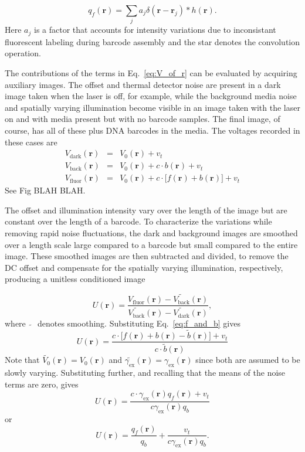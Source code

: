 \begin{equation} \label{eq:withPSF}
q_f(\mathbf{r})=\sum_j a_j \delta(\mathbf{r}-\mathbf{r}_j) * h(\mathbf{r}).
\end{equation}
Here $a_j$ is a factor that accounts for intensity variations due to inconsistant fluorescent labeling  during barcode assembly and the star denotes the convolution operation.

The contributions of the terms in Eq.~\ref{eq:V_of_r} can be evaluated by acquiring auxiliary images. The offset and thermal detector noise are present in a dark image taken when the laser is off, for example, while the background media noise and spatially varying illumination become visible in an image taken with the laser on and with media present but with no barcode samples. The final image, of course, has all of these plus DNA barcodes in the media. The voltages recorded in these cases are
\begin{eqnarray}
V_{\text{dark}}(\mathbf{r})&=&V_0(\mathbf{r})+v_t\\
V_{\text{back}}(\mathbf{r})&=&V_0(\mathbf{r})+c \cdot  b(\mathbf{r})  +v_t\\
V_{\text{fluor}}(\mathbf{r})&=&V_0(\mathbf{r})+c \cdot \big[ f(\mathbf{r}) + b(\mathbf{r})\big]  +v_t
\end{eqnarray}
See Fig BLAH BLAH. 

The offset and illumination intensity vary over the length of the image but are constant over the length of a barcode. To characterize the variations while removing rapid noise fluctuations, the dark and background images are smoothed over a length scale large compared to a barcode but small compared to the entire image. These smoothed images are then subtracted and divided, to remove the DC offset and compensate for the spatially varying illumination, respectively, producing a unitless conditioned image

\begin{equation}
U(\mathbf{r})= \frac{ V_{\text{fluor}}(\mathbf{r}) - \widetilde{V_{\text{back}}}(\mathbf{r})  }{ \widetilde{V_{\text{back}}}(\mathbf{r}) - \widetilde{ V_{\text{dark}}}(\mathbf{r})} ,
\end{equation}
where~$\widetilde{~~}$~denotes smoothing. Substituting Eq.~\ref{eq:f_and_b} gives
\begin{equation}
U(\mathbf{r})= \frac{ c \cdot \big[ f(\mathbf{r})  +b(\mathbf{r}) -\widetilde{b}(\mathbf{r}) \big]+ v_t  }{   c \cdot \widetilde{b}(\mathbf{r}) }
\end{equation}
Note that $\widetilde{ V_0}(\mathbf{r}) = V_0(\mathbf{r})$ and $\widetilde{\gamma_{\text{ex}}}(\mathbf{r})  = \gamma_{\text{ex}}(\mathbf{r})$ since both are assumed to be slowly varying. Substituting further, and recalling that the means of the noise terms are zero, gives
\begin{equation}
U(\mathbf{r})= \frac{ c \cdot \gamma_{\text{ex}}(\mathbf{r}) q_f(\mathbf{r})  + v_t  }{ c \gamma_{\text{ex}}(\mathbf{r})  q_b }
\end{equation}
or
\begin{equation}\label{eq:realDeal}
U(\mathbf{r})= \frac{ q_f(\mathbf{r}) }{ q_b}   + \frac{ v_t }{   c \gamma_{\text{ex}}(\mathbf{r}) q_b}.
\end{equation}


